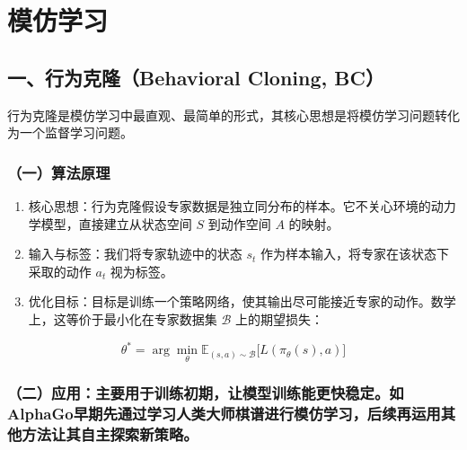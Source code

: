 \setcounter{section}{0}

\hypertarget{ux6a21ux4effux5b66ux4e60}{%
\section{模仿学习}\label{ux6a21ux4effux5b66ux4e60}}

\hypertarget{ux4e00ux884cux4e3aux514bux9686behavioral-cloning-bc}{%
\subsection{一、行为克隆（Behavioral Cloning, BC）}\label{ux4e00ux884cux4e3aux514bux9686behavioral-cloning-bc}}

行为克隆是模仿学习中最直观、最简单的形式，其核心思想是将模仿学习问题转化为一个监督学习问题。

\hypertarget{ux4e00ux7b97ux6cd5ux539fux7406}{%
\subsubsection{（一）算法原理}\label{ux4e00ux7b97ux6cd5ux539fux7406}}

\begin{enumerate}
\def\labelenumi{\arabic{enumi}.}
\item
  核心思想：行为克隆假设专家数据是独立同分布的样本。它不关心环境的动力学模型，直接建立从状态空间 \(S\) 到动作空间 \(A\) 的映射。
\item
  输入与标签：我们将专家轨迹中的状态 \(s_t\) 作为样本输入，将专家在该状态下采取的动作 \(a_t\) 视为标签。
\item
{}
  优化目标：目标是训练一个策略网络，使其输出尽可能接近专家的动作。数学上，这等价于最小化在专家数据集 \(\mathcal{B}\) 上的期望损失：
\end{enumerate}

\[
\theta^{*}
=
\arg\min_\theta
\mathbb{E}_{(s,a)\sim\mathcal{B}}
\bigl[
L(\pi_\theta(s),a)
\bigr]
\]

\hypertarget{ux4e8cux5e94ux7528ux4e3bux8981ux7528ux4e8eux8badux7ec3ux521dux671fux8ba9ux6a21ux578bux8badux7ec3ux80fdux66f4ux5febux7a33ux5b9aux5982alphagoux65e9ux671fux5148ux901aux8fc7ux5b66ux4e60ux4ebaux7c7bux5927ux5e08ux68cbux8c31ux8fdbux884cux6a21ux4effux5b66ux4e60ux540eux7eedux518dux8fd0ux7528ux5176ux4ed6ux65b9ux6cd5ux8ba9ux5176ux81eaux4e3bux63a2ux7d22ux65b0ux7b56ux7565}{%
\subsubsection{（二）应用：主要用于训练初期，让模型训练能更快稳定。如AlphaGo早期先通过学习人类大师棋谱进行模仿学习，后续再运用其他方法让其自主探索新策略。}\label{ux4e8cux5e94ux7528ux4e3bux8981ux7528ux4e8eux8badux7ec3ux521dux671fux8ba9ux6a21ux578bux8badux7ec3ux80fdux66f4ux5febux7a33ux5b9aux5982alphagoux65e9ux671fux5148ux901aux8fc7ux5b66ux4e60ux4ebaux7c7bux5927ux5e08ux68cbux8c31ux8fdbux884cux6a21ux4effux5b66ux4e60ux540eux7eedux518dux8fd0ux7528ux5176ux4ed6ux65b9ux6cd5ux8ba9ux5176ux81eaux4e3bux63a2ux7d22ux65b0ux7b56ux7565}}

